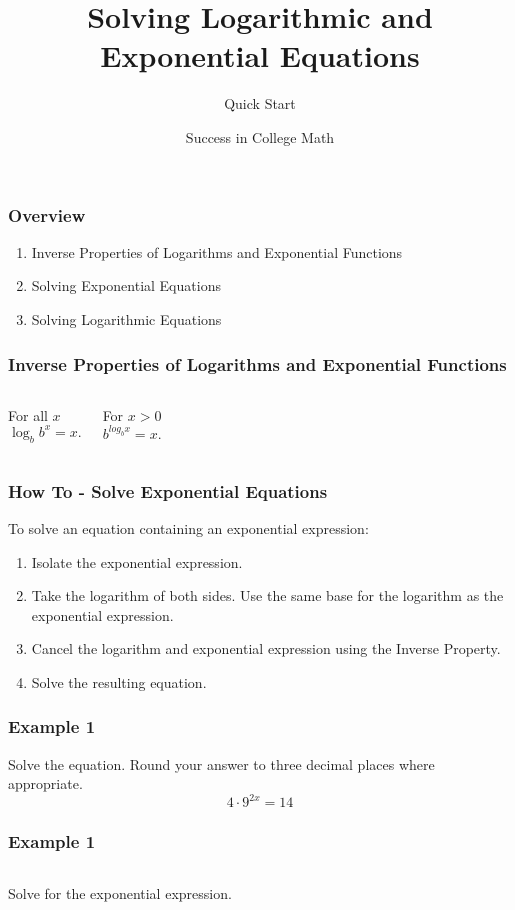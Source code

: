 \documentclass[aspectratio=169,17pt]{beamer}
\title{Solving Logarithmic and Exponential Equations}
\subtitle{Quick Start}
\author{\textsf{Success in College Math}}
\date{}
\begin{document}
\begin{frame}
	\titlepage
\end{frame}

\begin{frame}
	\frametitle{Overview}
	\pause
	\begin{enumerate}
		\item Inverse Properties of Logarithms and Exponential Functions \pause
		\item Solving Exponential Equations \pause
		\item Solving Logarithmic Equations
	\end{enumerate}
\end{frame}

\begin{frame}
	\frametitle{Inverse Properties of Logarithms and Exponential Functions}
	\begin{columns}
		For all $x$
		$$\log_b{b^x} = x.$$

		For $x > 0$
		$$b^{log_b{x}} = x.$$
	\end{columns}
\end{frame}

\begin{frame}
	\frametitle{How To - Solve Exponential Equations}
	To solve an equation containing an exponential expression: \pause
	\begin{enumerate}
		\item Isolate the exponential expression. \pause
		\item Take the logarithm of both sides. Use the same base for the logarithm as the exponential expression. \pause
		\item Cancel the logarithm and exponential expression using the Inverse Property. \pause
		\item Solve the resulting equation.
	\end{enumerate}
\end{frame}

\begin{frame}[t]
	\frametitle{Example 1}
	Solve the equation. Round your answer to three decimal places where appropriate.
	$$4 \cdot 9^{2x} = 14$$
\end{frame}

\begin{frame}
	\frametitle{Example 1}
	\begin{columns}
		\column{0.3\textwidth}
			Solve for the exponential expression.
		\column{0.7\textwidth}
			
	\end{columns}
\end{frame}
\end{document}
